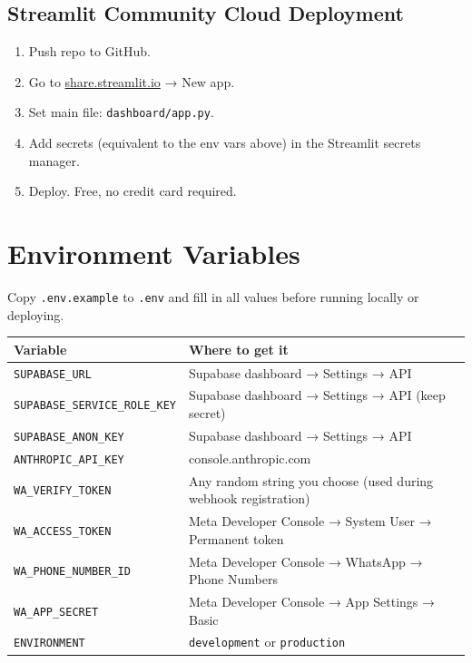 \documentclass[11pt, a4paper]{article}
\begin{document}
\subsection{Streamlit Community Cloud Deployment}

\begin{enumerate}[leftmargin=1.5em]
  \item Push repo to GitHub.
  \item Go to \href{https://share.streamlit.io}{share.streamlit.io} → New app.
  \item Set main file: \texttt{dashboard/app.py}.
  \item Add secrets (equivalent to the env vars above) in the Streamlit secrets manager.
  \item Deploy. Free, no credit card required.
\end{enumerate}

\newpage

\section{Environment Variables}

Copy \texttt{.env.example} to \texttt{.env} and fill in all values before running locally or deploying.

\renewcommand{\arraystretch}{1.3}
\begin{tabularx}{\linewidth}{lX}
\toprule
\textbf{Variable} & \textbf{Where to get it} \\
\midrule
\texttt{SUPABASE\_URL}              & Supabase dashboard → Settings → API \\
\texttt{SUPABASE\_SERVICE\_ROLE\_KEY} & Supabase dashboard → Settings → API (keep secret) \\
\texttt{SUPABASE\_ANON\_KEY}        & Supabase dashboard → Settings → API \\
\texttt{ANTHROPIC\_API\_KEY}        & console.anthropic.com \\
\texttt{WA\_VERIFY\_TOKEN}          & Any random string you choose (used during webhook registration) \\
\texttt{WA\_ACCESS\_TOKEN}          & Meta Developer Console → System User → Permanent token \\
\texttt{WA\_PHONE\_NUMBER\_ID}      & Meta Developer Console → WhatsApp → Phone Numbers \\
\texttt{WA\_APP\_SECRET}            & Meta Developer Console → App Settings → Basic \\
\texttt{ENVIRONMENT}                & \texttt{development} or \texttt{production} \\
\bottomrule
\end{tabularx}
\end{document}
